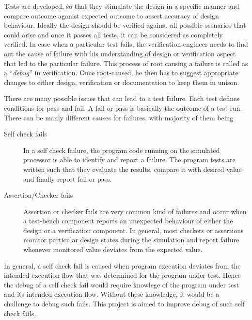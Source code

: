 Tests are developed, so that they stimulate the design in a specific manner and compare outcome aganist expected outcome to assert accuracy of design behaviour. Ideally the design should be verified against all possible scenarios that could arise and once it passes all tests, it can be considered as completely verified. In case when a particular test fails, the verification engineer needs to find out the cause of failure with his understanding of design or verification aspect that led to the particular failure. This process of root causing a failure is called as a ``{\it debug}'' in verification. Once root-caused, he then has to suggest appropriate changes to either design, verification or documentation to keep them in unison. 

There are many possible issues that can lead to a test failure. Each test defines conditions for pass and fail. A fail or pass is basically the outcome of a test run. There can be manly different causes for failures, with majority of them being

\begin{description}
	\item[Self check fails]  In a self check failure, the program code running on the simulated processor is able to identify and report a failure. The program tests are written such that they evaluate the results, compare it with desired value and finally report fail or pass. 
	\item[Assertion/Checker fails] Assertion or checker fails are very common kind of failures and occur when a test-bench component reports an unexpected behaviour of either the design or a verification component. In general, most checkers or assertions monitor particular design states during the simulation and report failure whenever monitored value deviates from the expected value. 
\end{description}

In general, a self check fail is caused when program execution deviates from the intended execution flow that was determined for the program under test. Hence the debug of a self check fail would require knowlege of the program under test and its intended execution flow. Without these knowledge, it would be a challenge to debug such fails. This project is aimed to improve debug of such self check fails.

%
%
%

